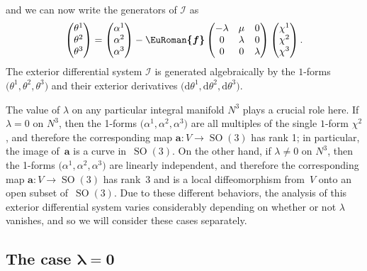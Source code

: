 \documentclass[pdftex]{sigma}
\numberwithin{equation}{section}
\newcommand{\eurom}{\EuRoman}
\renewcommand{\d}{\mathrm{d}}%
\newcommand{\cI}{{\mathcal I}}
\newcommand{\SO}{\operatorname{SO}}
\newcommand{\mba}{\mathbf{a}}
\newcommand{\eurof}{\bm{\eurom{f}}}
\begin{document}
and we can now write the generators of $\cI$ as
\begin{gather} \label{rank1-generators-for-I}
\begin{pmatrix} \theta^1 \\ \theta^2 \\ \theta^3 \end{pmatrix} = \begin{pmatrix} \alpha^1 \\ \alpha^2 \\ \alpha^3 \end{pmatrix} - \eurof \begin{pmatrix} -\lambda & \mu & 0 \\ 0 & \lambda & 0 \\ 0 & 0 & \lambda \end{pmatrix}
\begin{pmatrix} \chi^1 \\ \chi^2 \\ \chi^3 \end{pmatrix}.
\end{gather}
The exterior differential system $\cI$ is generated algebraically by the $1$-forms $\big(\theta^1, \theta^2, \theta^3\big)$ and their exterior derivatives $\big(\d\theta^1, \d\theta^2, \d\theta^3\big)$.

The value of $\lambda$ on any particular integral manifold $N^3$ plays a crucial role here. If $\lambda=0$ on $N^3$, then the 1-forms $\big(\alpha^1, \alpha^2, \alpha^3\big)$ are all multiples of the single $1$-form $\chi^2$, and therefore the corresponding map $\mba\colon V \to \SO(3)$ has rank 1; in particular, the image of~$\mba$ is a curve in~$\SO(3)$. On the other hand, if $\lambda \neq 0$ on $N^3$, then the 1-forms $\big(\alpha^1, \alpha^2, \alpha^3\big)$ are linearly independent, and therefore the corresponding map $\mba\colon V \to \SO(3)$ has rank~3 and is a local diffeomorphism from~$V$ onto an open subset of~$\SO(3)$. Due to these different behaviors, the analysis of this exterior differential system varies considerably depending on whether or not $\lambda$ vanishes, and so we will consider these cases separately.

\subsection[The case $\lambda = 0$]{The case $\boldsymbol{\lambda = 0}$}\label{lambda-zero-sec}
\end{document}
